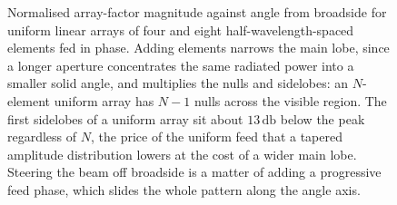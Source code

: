 \begin{figure}[htbp]
\centering
{}
\caption[Array factor of four- and eight-element broadside
arrays]{Normalised array-factor magnitude against angle from broadside for
uniform linear arrays of four and eight half-wavelength-spaced elements
fed in phase. Adding elements narrows the main lobe, since a longer
aperture concentrates the same radiated power into a smaller solid angle,
and multiplies the nulls and sidelobes: an $N$-element uniform array has
$N-1$ nulls across the visible region. The first sidelobes of a uniform
array sit about $13\,\si{\decibel}$ below the peak regardless of $N$, the
price of the uniform feed that a tapered amplitude distribution lowers at
the cost of a wider main lobe. Steering the beam off broadside is a matter
of adding a progressive feed phase, which slides the whole pattern along
the angle axis.}
\label{fig:vol04ch10:array-factor-nulls}
\end{figure}
